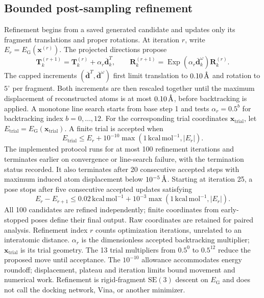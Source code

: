 \documentclass{article}
\newcommand{\angstrom}{\text{\normalfont\AA}}
\newcommand{\SE}{\mathrm{SE}}
\begin{document}
\subsection{Bounded post-sampling refinement}
\label{si:guidance_refinement}

Refinement begins from a saved generated candidate and updates only its fragment translations and proper rotations.
At iteration \(r\), write \(E_r=E_{\mathrm G}(\mathbf x^{(r)})\).  The projected directions propose
\begin{equation}
    \mathbf{T}_k^{(r+1)}
    =\mathbf{T}_k^{(r)}+\alpha_r\bar{\mathbf{d}}_k^T,
    \qquad
    \mathbf{R}_k^{(r+1)}
    =\operatorname{Exp}(\alpha_r\bar{\mathbf{d}}_k^\omega)
     \mathbf{R}_k^{(r)}.
    \label{eq:si_guidance_refinement_step}
\end{equation}
The capped increments \((\bar{\mathbf d}^T,\bar{\mathbf d}^\omega)\) first limit translation to \(0.10\,\angstrom\) and rotation to \(5^\circ\) per fragment. Both increments are then rescaled together until the maximum displacement of reconstructed atoms is at most \(0.10\,\angstrom\), before backtracking is applied.
A monotone line search starts from base step 1 and tests \(\alpha_r=0.5^b\) for backtracking index \(b=0,\ldots,12\).
For the corresponding trial coordinates \(\mathbf x_{\mathrm{trial}}\), let \(E_{\mathrm{trial}}=E_{\mathrm G}(\mathbf x_{\mathrm{trial}})\). A finite trial is accepted when
\begin{equation}
    E_{\mathrm{trial}}
    \leq E_r+10^{-10}
      \max(1\,\mathrm{kcal\,mol^{-1}},|E_r|).
    \label{eq:si_guidance_acceptance}
\end{equation}
The implemented protocol runs for at most 100 refinement iterations and terminates earlier on convergence or line-search failure, with the termination status recorded.
It also terminates after 20 consecutive accepted steps with maximum induced atom displacement below \(10^{-5}\,\angstrom\).
Starting at iteration 25, a pose stops after five consecutive accepted updates satisfying
\begin{equation}
    E_r-E_{r+1}
    \leq
    0.02\,\mathrm{kcal\,mol^{-1}}
    +10^{-3}\max\!\left(1\,\mathrm{kcal\,mol^{-1}},|E_r|\right).
    \label{eq:si_guidance_adaptive_stop}
\end{equation}
All 100 candidates are refined independently; finite coordinates from early-stopped poses define their final output.
Raw coordinates are retained for paired analysis.
Refinement index \(r\) counts optimization iterations, unrelated to an interatomic distance. \(\alpha_r\) is the dimensionless accepted backtracking multiplier; \(\mathbf x_{\mathrm{trial}}\) is its trial geometry. The 13 trial multipliers from \(0.5^0\) to \(0.5^{12}\) reduce the proposed move until acceptance. The \(10^{-10}\) allowance accommodates energy roundoff; displacement, plateau and iteration limits bound movement and numerical work.
Refinement is rigid-fragment \(\SE(3)\) descent on \(E_{\mathrm{G}}\) and does not call the docking network, Vina, or another minimizer.
\end{document}
